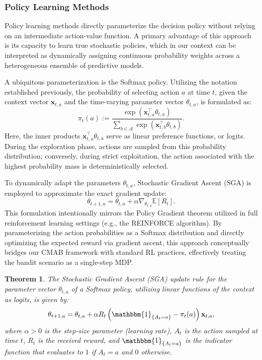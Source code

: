 \documentclass[pdflatex,sn-mathphys-num]{sn-jnl}
\theoremstyle{thmstyleone}%
\newtheorem{theorem}{Theorem}%
\theoremstyle{thmstyletwo}%
\theoremstyle{thmstylethree}%
\begin{document}
\subsubsection{Policy Learning Methods}

Policy learning methods directly parameterize the decision policy without relying on an intermediate action-value function. A primary advantage of this approach is its capacity to learn true stochastic policies, which in our context can be interpreted as dynamically assigning continuous probability weights across a heterogeneous ensemble of predictive models.

A ubiquitous parameterization is the Softmax policy. Utilizing the notation established previously, the probability of selecting action $a$ at time $t$, given the context vector $\mathbf{x}_{t,a}$ and the time-varying parameter vector $\theta_{t,a}$, is formulated as:
\begin{equation}
\pi_t(a) := \frac{\exp\left(\mathbf{x}_{t,a}^\top\theta_{t,a}\right)}{\sum_{b \in \mathcal{A}} \exp\left(\mathbf{x}_{t,b}^\top\theta_{t,b}\right)}.
\end{equation}
Here, the inner products $\mathbf{x}_{t,a}^\top\theta_{t,a}$ serve as linear preference functions, or logits. During the exploration phase, actions are sampled from this probability distribution; conversely, during strict exploitation, the action associated with the highest probability mass is deterministically selected. 

To dynamically adapt the parameters $\theta_{t,a}$, Stochastic Gradient Ascent (SGA) is employed to approximate the exact gradient update:
\begin{equation}
\theta_{t+1, a} = \theta_{t,a} + \alpha \nabla_{\theta_{t,a}} \mathbb{E}\left[ R_t \right].
\end{equation}
This formulation intentionally mirrors the Policy Gradient theorem utilized in full reinforcement learning settings (e.g., the REINFORCE algorithm). By parameterizing the action probabilities as a Softmax distribution and directly optimizing the expected reward via gradient ascent, this approach conceptually bridges our CMAB framework with standard RL practices, effectively treating the bandit scenario as a single-step MDP.

\begin{theorem}
    The Stochastic Gradient Ascent (SGA) update rule for the parameter vector $\theta_{t,a}$ of a Softmax policy, utilizing linear functions of the context as logits, is given by:
    \begin{equation}
        \theta_{t+1,a} = \theta_{t,a} + \alpha R_t \left(\mathbbm{1}_{\{A_t=a\}} - \pi_t(a) \right) \mathbf{x}_{t,a},
    \end{equation}
    where $\alpha > 0$ is the step-size parameter (learning rate), $A_t$ is the action sampled at time $t$, $R_t$ is the received reward, and $\mathbbm{1}_{\{A_t=a\}}$ is the indicator function that evaluates to $1$ if $A_t = a$ and $0$ otherwise.
\end{theorem}
\end{document}
